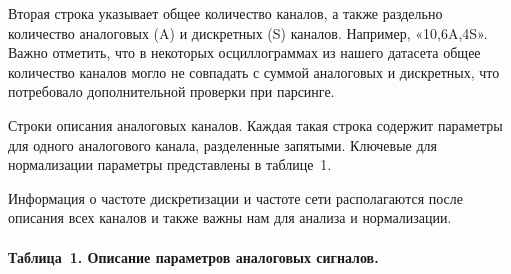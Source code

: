 Вторая строка указывает общее количество каналов, а также раздельно количество аналоговых (A) и дискретных (S) каналов. Например, «10,6A,4S». Важно отметить, что в некоторых осциллограммах из нашего датасета общее количество каналов могло не совпадать с суммой аналоговых и дискретных, что потребовало дополнительной проверки при парсинге.\par\vspace{0.2cm}

Строки описания аналоговых каналов. Каждая такая строка содержит параметры для одного аналогового канала, разделенные запятыми. Ключевые для нормализации параметры представлены в таблице~1.\par\vspace{0.2cm}

Информация о частоте дискретизации и частоте сети располагаются после описания всех каналов и также важны нам для анализа и нормализации.\par\vspace{0.2cm}

\paragraph{Таблица~1. Описание параметров аналоговых сигналов.}
\label{tab:ch03_analog_signals_parameters}


